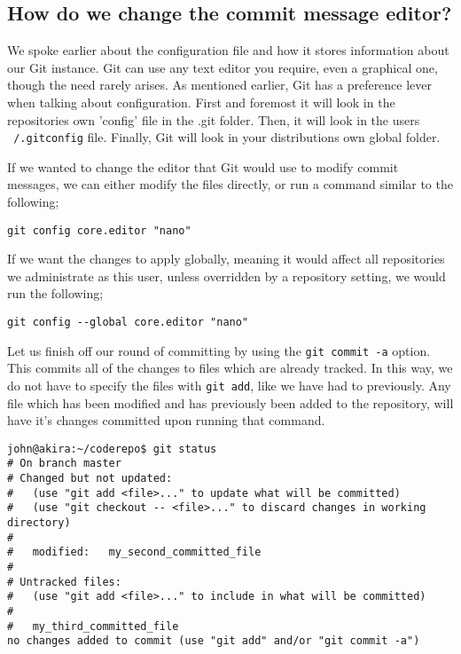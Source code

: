 \subsection{How do we change the commit message editor?}

We spoke earlier about the configuration file and how it stores information about our Git instance.  Git can use any text editor you require, even a graphical one, though the need rarely arises.  As mentioned earlier, Git has a preference lever when talking about configuration.  First and foremost it will look in the repositories own 'config' file in the .git folder.  Then, it will look in the users \texttt{~/.gitconfig} file.  Finally, Git will look in your distributions own global folder.  

If we wanted to change the editor that Git would use to modify commit messages, we can either modify the files directly, or run a command similar to the following;

\begin{Verbatim}[frame=single,fontsize=\relsize{-3}] 
git config core.editor "nano"
\end{Verbatim}

If we want the changes to apply globally, meaning it would affect all repositories we administrate as this user, unless overridden by a repository setting, we would run the following;

\begin{Verbatim}[frame=single,fontsize=\relsize{-3}] 
git config --global core.editor "nano"
\end{Verbatim}

Let us finish off our round of committing by using the \texttt{git commit -a} option.  This commits all of the changes to files which are already tracked.  In this way, we do not have to specify the files with \texttt{git add}, like we have had to previously.  Any file which has been modified and has previously been added to the repository, will have it's changes committed upon running that command.

\begin{Verbatim}[frame=single,fontsize=\relsize{-3}] 
john@akira:~/coderepo$ git status 
# On branch master 
# Changed but not updated: 
#   (use "git add <file>..." to update what will be committed) 
#   (use "git checkout -- <file>..." to discard changes in working directory) 
# 
#	modified:   my_second_committed_file 
# 
# Untracked files: 
#   (use "git add <file>..." to include in what will be committed) 
# 
#	my_third_committed_file 
no changes added to commit (use "git add" and/or "git commit -a")
\end{Verbatim} 

